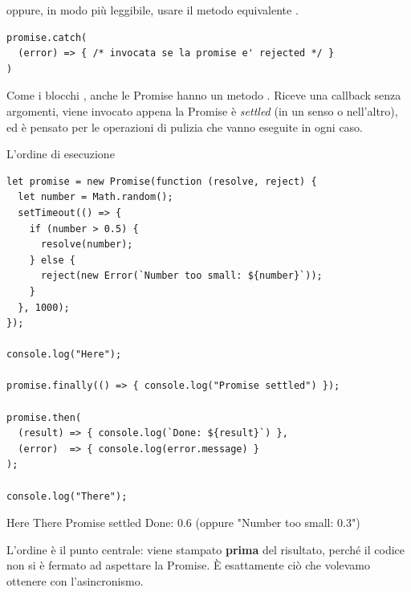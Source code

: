 \noindent oppure, in modo più leggibile, usare il metodo equivalente
.

\begin{lstlisting}[style=js]
promise.catch(
  (error) => { /* invocata se la promise e' rejected */ }
)
\end{lstlisting}

Come i blocchi , anche le Promise hanno un metodo
. Riceve una callback senza argomenti, viene invocato appena la
Promise è \textit{settled} (in un senso o nell'altro), ed è pensato per le
operazioni di pulizia che vanno eseguite in ogni caso.

\begin{esempio}{L'ordine di esecuzione}
\begin{affianco}[0.55][c]
\begin{lstlisting}[style=js, name=promise-ordine.js]
let promise = new Promise(function (resolve, reject) {
  let number = Math.random();
  setTimeout(() => {
    if (number > 0.5) {
      resolve(number);
    } else {
      reject(new Error(`Number too small: ${number}`));
    }
  }, 1000);
});

console.log("Here");

promise.finally(() => { console.log("Promise settled") });

promise.then(
  (result) => { console.log(`Done: ${result}`) },
  (error)  => { console.log(error.message) }
);

console.log("There");
\end{lstlisting}
\risultato
\begin{immagine}
\end{immagine}
\begin{console}
Here
There
Promise settled
Done: 0.6      (oppure "Number too small: 0.3")
\end{console}
\end{affianco}

L'ordine è il punto centrale:  viene stampato \textbf{prima} del
risultato, perché il codice non si è fermato ad aspettare la Promise. È
esattamente ciò che volevamo ottenere con l'asincronismo.
\end{esempio}

